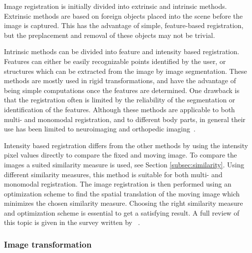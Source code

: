 Image registration is initially divided into extrinsic and intrinsic methods. Extrinsic methods are based on foreign objects placed into the scene before the image is captured. This has the advantage of simple, feature-based registration, but the preplacement and removal of these objects may not be trivial. 

Intrinsic methods can be divided into feature and intensity based registration. Features can either be easily recognizable points identified by the user, or structures which can be extracted from the image by image segmentation. These methods are mostly used in rigid transformations, and have the advantage of being simple computations once the features are determined. One drawback is that the registration often is limited by the reliability of the segmentation or identification of the features. Although these methods are applicable to both multi- and monomodal registration, and to different body parts, in general their use has been limited to neuroimaging and orthopedic imaging~\cite{Maintz1998}.

Intensity based registration differs from the other methods by using the intensity pixel values directly to compare the fixed and moving image. To compare the images a suited similarity measure is used, see Section \ref{subsec:similarity}. Using different similarity measures, this method is suitable for both multi- and monomodal registration. The image registration is then performed using an optimization scheme to find the spatial translation of the moving image which minimizes the chosen similarity measure. Choosing the right similarity measure and optimization scheme is essential to get a satisfying result. A full review of this topic is given in the survey written by ~\citet{Maintz1998}.

%

\subsubsection{Image transformation}

